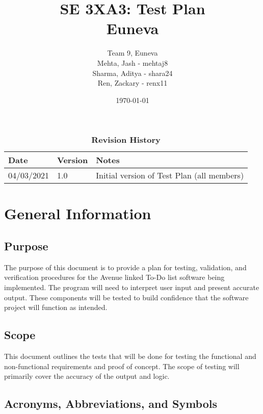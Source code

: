 \documentclass[12pt, titlepage]{article}
\title{SE 3XA3: Test Plan\\Euneva}
\author{Team 9, Euneva
		\\ Mehta, Jash - mehtaj8
		\\ Sharma, Aditya - shara24
		\\ Ren, Zackary - renx11
}
\date{\today}
\begin{document}
\maketitle

\tableofcontents
\listoftables
\listoffigures

\begin{table}[bp]
\caption{\bf Revision History}
\begin{tabularx}{\textwidth}{p{3cm}p{2cm}X}
\toprule {\bf Date} & {\bf Version} & {\bf Notes}\\
\midrule
04/03/2021 & 1.0 & Initial version of Test Plan (all members)\\
\bottomrule
\end{tabularx}
\end{table}

\newpage


\section{General Information}

\subsection{Purpose}

The purpose of this document is to provide a plan for testing, validation, and verification procedures for the Avenue linked To-Do list software being implemented. The program will need to interpret user input and present accurate output. These components will be tested to build confidence that the software project will function as intended.

\subsection{Scope}

This document outlines the tests that will be done for testing the functional and non-functional requirements and proof of concept. The scope of testing will primarily cover the accuracy of the output and logic.

\subsection{Acronyms, Abbreviations, and Symbols}
\end{document}

